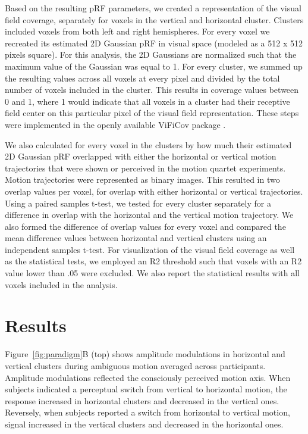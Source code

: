 Based on the resulting pRF parameters, we created a representation of the visual field coverage, separately for voxels in the vertical and horizontal cluster. Clusters included voxels from both left and right hemispheres. For every voxel we recreated its estimated 2D Gaussian pRF in visual space (modeled as a 512 x 512 pixels square). For this analysis, the 2D Gaussians are normalized such that the maximum value of the Gaussian was equal to 1. For every cluster, we summed up the resulting values across all voxels at every pixel and divided by the total number of voxels included in the cluster. This results in coverage values between 0 and 1, where 1 would indicate that all voxels in a cluster had their receptive field center on this particular pixel of the visual field representation. These steps were implemented in the openly available ViFiCov package \parencite{vificov}.

We also calculated for every voxel in the clusters by how much their estimated 2D Gaussian pRF overlapped with either the horizontal or vertical motion trajectories that were shown or perceived in the motion quartet experiments. Motion trajectories were represented as binary images. This resulted in two overlap values per voxel, for overlap with either horizontal or vertical trajectories. Using a paired samples t-test, we tested for every cluster separately for a difference in overlap with the horizontal and the vertical motion trajectory. We also formed the difference of overlap values for every voxel and compared the mean difference values between horizontal and vertical clusters using an independent samples t-test. For visualization of the visual field coverage as well as the statistical tests, we employed an R2 threshold such that voxels with an R2 value lower than .05 were excluded. We also report the statistical results with all voxels included in the analysis.

\section{Results}
Figure~\ref{fig:paradigm}B (top) shows amplitude modulations in horizontal and vertical clusters during ambiguous motion averaged across participants. Amplitude modulations reflected the consciously perceived motion axis. When subjects indicated a perceptual switch from vertical to horizontal motion, the response increased in horizontal clusters and decreased in the vertical ones. Reversely, when subjects reported a switch from horizontal to vertical motion, signal increased in the vertical clusters and decreased in the horizontal ones.

